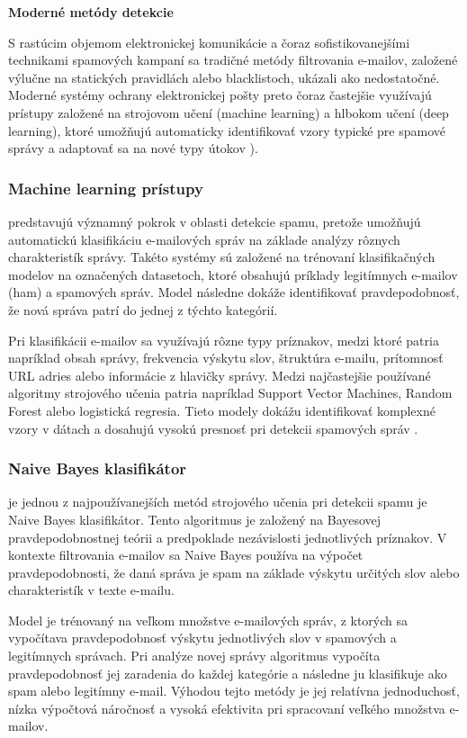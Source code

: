 \documentclass[conference]{IEEEtran}
\begin{document}
\textbf{Moderné metódy detekcie}

S rastúcim objemom elektronickej komunikácie a čoraz sofistikovanejšími technikami spamových kampaní sa tradičné metódy filtrovania e-mailov, založené výlučne na statických pravidlách alebo blacklistoch, ukázali ako nedostatočné. Moderné systémy ochrany elektronickej pošty preto čoraz častejšie využívajú prístupy založené na strojovom učení (machine learning) a hlbokom učení (deep learning), ktoré umožňujú automaticky identifikovať vzory typické pre spamové správy a adaptovať sa na nové typy útokov \cite{karim2019spam}).

\subsubsection*{Machine learning prístupy}
predstavujú významný pokrok v oblasti detekcie spamu, pretože umožňujú automatickú klasifikáciu e-mailových správ na základe analýzy rôznych charakteristík správy. Takéto systémy sú založené na trénovaní klasifikačných modelov na označených datasetoch, ktoré obsahujú príklady legitímnych e-mailov (ham) a spamových správ. Model následne dokáže identifikovať pravdepodobnosť, že nová správa patrí do jednej z týchto kategórií\cite{karim2019spam}.

Pri klasifikácii e-mailov sa využívajú rôzne typy príznakov, medzi ktoré patria napríklad obsah správy, frekvencia výskytu slov, štruktúra e-mailu, prítomnosť URL adries alebo informácie z hlavičky správy. Medzi najčastejšie používané algoritmy strojového učenia patria napríklad Support Vector Machines, Random Forest alebo logistická regresia. Tieto modely dokážu identifikovať komplexné vzory v dátach a dosahujú vysokú presnosť pri detekcii spamových správ \cite{karim2019spam}.


\subsubsection*{Naive Bayes klasifikátor}

je jednou z najpoužívanejších metód strojového učenia pri detekcii spamu je Naive Bayes klasifikátor. Tento algoritmus je založený na Bayesovej pravdepodobnostnej teórii a predpoklade nezávislosti jednotlivých príznakov. V kontexte filtrovania e-mailov sa Naive Bayes používa na výpočet pravdepodobnosti, že daná správa je spam na základe výskytu určitých slov alebo charakteristík v texte e-mailu\cite{karim2019spam}.

Model je trénovaný na veľkom množstve e-mailových správ, z ktorých sa vypočítava pravdepodobnosť výskytu jednotlivých slov v spamových a legitímnych správach. Pri analýze novej správy algoritmus vypočíta pravdepodobnosť jej zaradenia do každej kategórie a následne ju klasifikuje ako spam alebo legitímny e-mail. Výhodou tejto metódy je jej relatívna jednoduchosť, nízka výpočtová náročnosť a vysoká efektivita pri spracovaní veľkého množstva e-mailov\cite{karim2019spam}.
\end{document}
